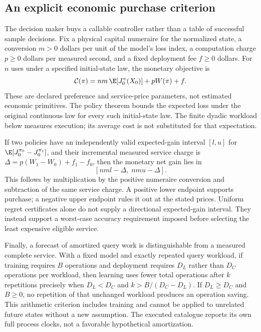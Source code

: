 \subsection{An explicit economic purchase criterion}\label{sec:purchase64}
The decision maker buys a callable controller rather than a table of successful sample decisions. Fix a physical capital numeraire for the normalized state, a conversion $m>0$ dollars per unit of the model's loss index, a computation charge $p\ge0$ dollars per measured second, and a fixed deployment fee $f\ge0$ dollars. For $n$ uses under a specified initial-state law, the monetary objective is
\[
 \mathcal C(\pi)=nm\,\E[J_0^\pi(X_0)]+pW(\pi)+f.
\]
These are declared preference and service-price parameters, not estimated economic primitives. The policy theorem bounds the expected loss under the original continuous law for every such initial-state law. The finite dyadic workload below measures execution; its average cost is not substituted for that expectation.

If two policies have an independently valid expected-gain interval $[l,u]$ for $\E[J_0^{\pi_0}-J_0^{\pi_1}]$, and their incremental measured service charge is $\Delta=p(W_1-W_0)+f_1-f_0$, then the monetary net gain lies in
\[
 [nm l-\Delta,\;nm u-\Delta].
\]
This follows by multiplication by the positive numeraire conversion and subtraction of the same service charge. A positive lower endpoint supports purchase; a negative upper endpoint rules it out at the stated prices. Uniform regret certificates alone do not supply a directional expected-gain interval. They instead support a worst-case accuracy requirement imposed before selecting the least expensive eligible service.

Finally, a forecast of amortized query work is distinguishable from a measured complete service. With a fixed model and exactly repeated query workload, if training requires $B$ operations and deployment requires $D_L$ rather than $D_C$ operations per workload, then learning uses fewer total operations after $k$ repetitions precisely when $D_L<D_C$ and $k>B/(D_C-D_L)$. If $D_L\ge D_C$ and $B\ge0$, no repetition of that unchanged workload produces an operation saving. This arithmetic criterion includes training and cannot be applied to unrelated future states without a new assumption. The executed catalogue reports its own full process clocks, not a favorable hypothetical amortization.
